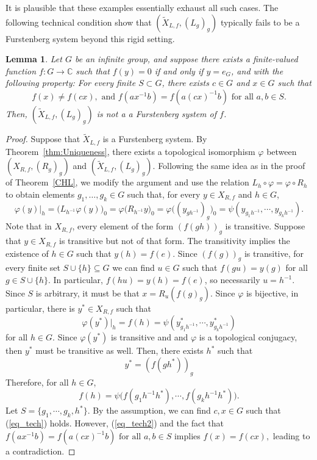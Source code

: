 \documentclass{amsart}
\numberwithin{equation}{section}
\newtheorem{lemma}{Lemma}[section]
\theoremstyle{definition}
\theoremstyle{plain}
\begin{document}
It is plausible that these examples essentially exhaust all such cases. 
The following technical condition show that $(\widetilde{X}_{L,f}, (L_g)_g)$ 
typically fails to be a Furstenberg system beyond this rigid setting.
    \begin{lemma}\label{tech}
           Let $G$ be an infinite group, and suppose there exists a finite-valued function $f:G\to \mathbb{C}$ such that $f(y)=0$ if and only if $y=e_G$, and with the following property: For every finite $S\subset G$, there exists $c\in G$ and $x\in G$ such that 
           \begin{equation}
               f(x)\neq f(cx), \text{ and } f(a x^{-1} b)=f(a(cx)^{-1}b) \text{ for all $a,b\in S$} .\label{eq_tech}
           \end{equation}
          Then, $(\widetilde{X}_{L,f},(L_g)_g)$ is not a a Furstenberg system of $f$.
    \end{lemma}
\begin{proof}
    Suppose that $\widetilde{X}_{L,f}$ is a Furstenberg system. By Theorem~\ref{thm:Uniqueness}, there exists a topological isomorphism
$\varphi$ between $(X_{R,f}, (R_g)_g)$ and $(\widetilde{X}_{L,f}, (L_g)_g)$.
Following the same idea as in the proof of Theorem~\ref{CHL}, we modify the argument and use the relation
$L_h \circ \varphi = \varphi \circ R_h$ to obtain elements $g_1, \ldots, g_k \in G$ such that, for every $y \in X_{R,f}$ and $h \in G$,  $$\varphi(y)|_{h}=\Big(L_{h^{-1}}\varphi(y)\Big)_0=\varphi\Big(R_{h^{-1}}y\Big)_0=\varphi\Big((y_{gh^{-1}})_g\Big)_0=\psi(y_{g_1h^{-1}},\cdots,y_{g_kh^{-1}}).$$
  Note that in $X_{R,f}$, every element of the form $(f(gh))_g$ is transitive. Suppose that $y\in X_{R,f}$ is transitive but not of that form. The transitivity implies the existence of $h\in G$ such that $y(h)=f(e)$. Since $(f(g))_g$ is transitive, for every finite set $S\cup \{h\}\subseteq G$ we can find $u\in G$ such that $f(gu)=y(g)$ for all $g\in S\cup \{h\}$. In particular, $f(hu)=y(h)=f(e)$, so necessarily $u=h^{-1}$. Since $S$ is arbitrary, it must be that $x=R_u (f(g)_g).$ Since $\varphi$ is bijective, in particular, there is $y^{*}\in X_{R,f}$ such that 
    $$\varphi(y^{*})|_h=f(h)=\psi(y^{*}_{g_1h^{-1}},\cdots,y^{*}_{g_kh^{-1}})$$ for all $h\in G$. Since $\varphi(y^{*})$ is transitive and and $\varphi$ is a topological conjugacy, then $y^{*}$ must be transitive as well. Then, there exists $h^{*}$ such that
    $$y^{*}=(f(gh^{*}))_g$$
    Therefore, for all $h\in G$,
    \begin{equation}
        f(h)=\psi\Big( f(g_1h^{-1}h^{*}),\cdots,f(g_kh^{-1}h^{*})\Big).\label{eq_tech2}
    \end{equation}
Let $S=\{g_1,\cdots,g_k,h^{*}\}.$ By the assumption, we can find $c,x\in G$ such that (\ref{eq_tech}) holds. However, (\ref{eq_tech2}) and the fact that $f(a x^{-1} b)=f(a(cx)^{-1}b) \text{ for all $a,b\in S$}$ implies $f(x)=f(cx),$ leading to a contradiction.
\end{proof}
    
\end{document}
